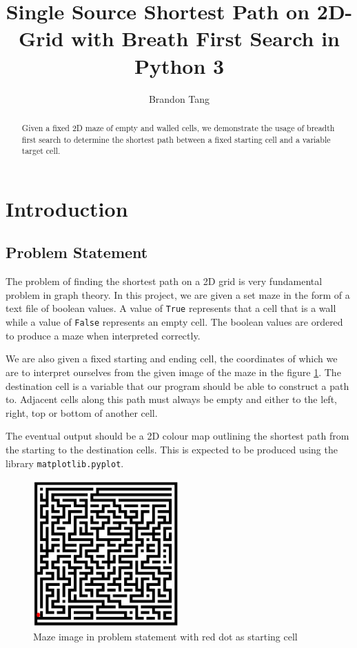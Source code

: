 \documentclass{article}
\begin{document}
\title{Single Source Shortest Path on 2D-Grid with Breath First Search in Python 3}
\author{Brandon Tang}
\maketitle

\begin{abstract}
    Given a fixed 2D maze of empty and walled cells, we demonstrate the usage of breadth first search to determine the shortest path between a fixed starting cell and a variable target cell.
\end{abstract}

\section{Introduction}

    \subsection{Problem Statement}
    The problem of finding the shortest path on a 2D grid is very fundamental problem in graph theory. In this project, we are given a set maze in the form of a text file of boolean values. A value of \texttt{True} represents that a cell that is a wall while a value of \texttt{False} represents an empty cell. The boolean values are ordered to produce a maze when interpreted correctly.

    We are also given a fixed starting and ending cell, the coordinates of which we are to interpret ourselves from the given image of the maze in the figure \ref{fig:problem_maze}. The destination cell is a variable that our program should be able to construct a path to. Adjacent cells along this path must always be empty and either to the left, right, top or bottom of another cell.

    The eventual output should be a 2D colour map outlining the shortest path from the starting to the destination cells. This is expected to be produced using the library \texttt{matplotlib.pyplot}.

    \begin{figure}[H]
        \centering
        \includegraphics[width=0.5\textwidth]{img/problem_statement_maze.png}
        \caption{Maze image in problem statement with red dot as starting cell}
        \label{fig:problem_maze}
    \end{figure}
\end{document}
